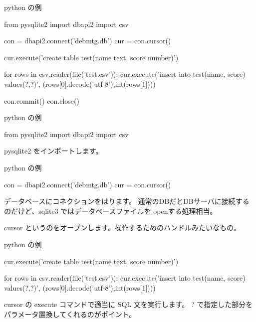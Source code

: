 \begin{frame}[containsverbatim]{python の例}
\begin{commandline}
from pysqlite2 import dbapi2
import csv

con = dbapi2.connect('debmtg.db')
cur = con.cursor()

cur.execute('create table test(name text, score number)')

for rows in csv.reader(file('test.csv')):
    cur.execute('insert into test(name, score) values(?,?)', 
                    (rows[0].decode('utf-8'),int(rows[1])))

con.commit()
con.close()

\end{commandline}
\end{frame}


\begin{frame}[containsverbatim]{python の例}
\begin{commandline}
from pysqlite2 import dbapi2
import csv
\end{commandline}

pysqlite2 をインポートします。

\end{frame}


\begin{frame}[containsverbatim]{python の例}
\begin{commandline}
con = dbapi2.connect('debmtg.db')
cur = con.cursor()
\end{commandline}

データベースにコネクションをはります。
通常のDBだとDBサーバに接続するのだけど、sqlite3 ではデータベースファイルを
 openする処理相当。

cursor というのをオープンします。操作するためのハンドルみたいなもの。

\end{frame}

\begin{frame}[containsverbatim]{python の例}
\begin{commandline}
cur.execute('create table test(name text, score number)')

for rows in csv.reader(file('test.csv')):
    cur.execute('insert into test(name, score) values(?,?)', 
                    (rows[0].decode('utf-8'),int(rows[1])))

\end{commandline}

cursor の execute コマンドで適当に SQL 文を実行します。
? で指定した部分をパラメータ置換してくれるのがポイント。

\end{frame}

